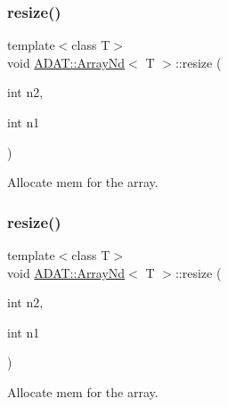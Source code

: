 \subsubsection{\texorpdfstring{resize()}{resize()}\hspace{0.1cm}{\footnotesize\ttfamily [5/10]}}
{\footnotesize\ttfamily template$<$class T$>$ \\
void \mbox{\hyperlink{classADAT_1_1ArrayNd}{A\+D\+A\+T\+::\+Array\+Nd}}$<$ T $>$\+::resize (\begin{DoxyParamCaption}\item[{int}]{n2,  }\item[{int}]{n1 }\end{DoxyParamCaption})\hspace{0.3cm}{\ttfamily [inline]}}



Allocate mem for the array. 

\mbox{\label{classADAT_1_1ArrayNd_ac66a29c373d99ae8ead2344c1024489e}} 
\subsubsection{\texorpdfstring{resize()}{resize()}\hspace{0.1cm}{\footnotesize\ttfamily [6/10]}}
{\footnotesize\ttfamily template$<$class T$>$ \\
void \mbox{\hyperlink{classADAT_1_1ArrayNd}{A\+D\+A\+T\+::\+Array\+Nd}}$<$ T $>$\+::resize (\begin{DoxyParamCaption}\item[{int}]{n2,  }\item[{int}]{n1 }\end{DoxyParamCaption})\hspace{0.3cm}{\ttfamily [inline]}}



Allocate mem for the array. 

\mbox{\label{classADAT_1_1ArrayNd_a1b042ead88dae6696d7a0c77fd01ddfa}} 
